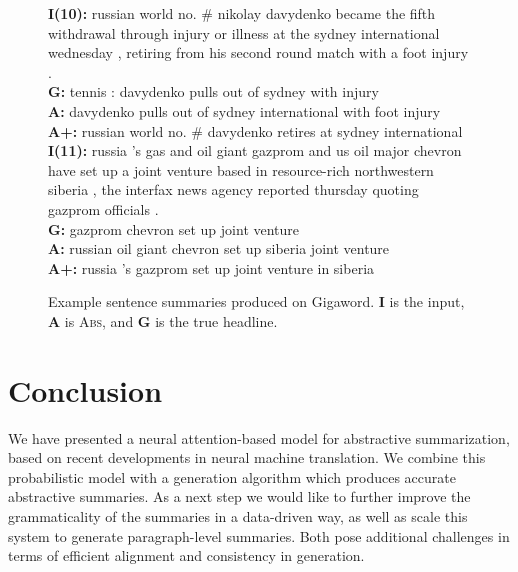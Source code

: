 \documentclass[11pt,a4paper]{article}
\begin{document}
\begin{figure}
\begin{framed}
\textbf{I(10):} russian world no. \# nikolay davydenko became the fifth withdrawal through injury or illness at the sydney international wednesday , retiring from his second round match with a foot injury . \\
\textbf{G:} tennis : davydenko pulls out of sydney with injury \\
\textbf{A:} davydenko pulls out of sydney international with foot injury \\
\textbf{A+:} russian world no. \# davydenko retires at sydney international \\

\textbf{I(11):} russia 's gas and oil giant gazprom and us oil major chevron have set up a joint venture based in resource-rich northwestern siberia , the interfax news agency reported thursday quoting gazprom officials . \\
\textbf{G:} gazprom chevron set up joint venture \\
\textbf{A:} russian oil giant chevron set up siberia joint venture \\
\textbf{A+:} russia 's gazprom set up joint venture in siberia 

  \end{framed}
  \vspace*{-0.5cm}
  \caption{\small \label{fig:examples} Example sentence summaries produced on Gigaword. \textbf{I} is the input, \textbf{A} is \textsc{Abs}, and \textbf{G} is the true headline.}
\end{figure}



\section{Conclusion}

We have presented a neural attention-based model for abstractive
summarization, based on recent developments in neural machine
translation. We combine this probabilistic model with a generation
algorithm which produces accurate abstractive summaries. As a next
step we would like to further improve the grammaticality of the
summaries in a data-driven way, as well as scale this system to
generate paragraph-level summaries. Both pose additional challenges in
terms of efficient alignment and consistency in
generation.

 


\end{document}
